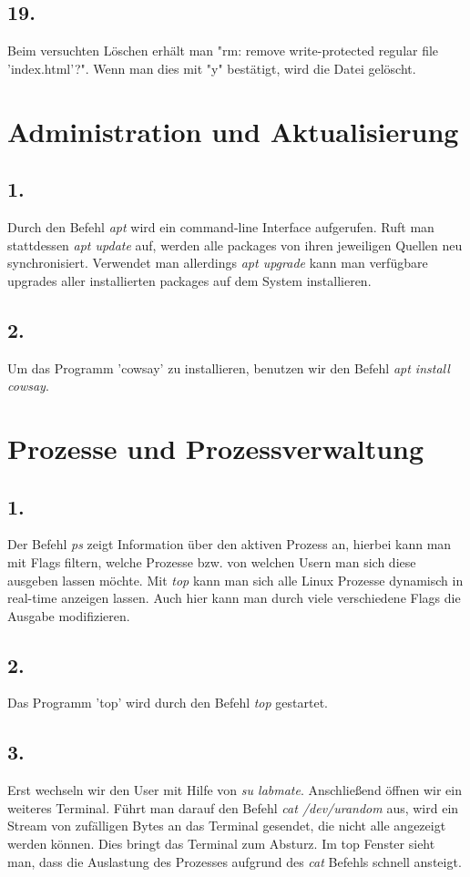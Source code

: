 \documentclass[
    fontsize=10pt,
    headings=medium,
    parskip=half,           %
    bibliography=totoc,
    numbers=noenddot,       %
    open=any,               %
    a4paper,
    ]{scrreprt}
\begin{document}
\subsection*{19.}
Beim versuchten Löschen erhält man "rm: remove write-protected regular file 'index.html'?". Wenn man dies mit "y" bestätigt, wird die Datei gelöscht.


\section{Administration und Aktualisierung}

\subsection*{1.}
Durch den Befehl \emph{apt} wird ein command-line Interface aufgerufen. Ruft man stattdessen \emph{apt update} auf, werden alle packages von ihren jeweiligen Quellen neu synchronisiert. Verwendet man allerdings \emph{apt upgrade} kann man verfügbare upgrades aller installierten packages auf dem System installieren. 

\subsection*{2.}
Um das Programm 'cowsay' zu installieren, benutzen wir den Befehl \emph{apt install cowsay}.

\section{Prozesse und Prozessverwaltung}

\subsection*{1.}
Der Befehl \emph{ps} zeigt Information über den aktiven Prozess an, hierbei kann man mit Flags filtern, welche Prozesse bzw. von welchen Usern man sich diese ausgeben lassen möchte. Mit \emph{top} kann man sich alle Linux Prozesse dynamisch in real-time anzeigen lassen. Auch hier kann man durch viele verschiedene Flags die Ausgabe modifizieren.

\subsection*{2.}
Das Programm 'top' wird durch den Befehl \emph{top} gestartet.

\subsection*{3.}
Erst wechseln wir den User mit Hilfe von \emph{su labmate}. Anschließend öffnen wir ein weiteres Terminal.
Führt man darauf den Befehl \emph{cat /dev/urandom} aus, wird ein Stream von zufälligen Bytes an das Terminal gesendet, die nicht alle angezeigt werden können. Dies bringt das Terminal zum Absturz. Im top Fenster sieht man, dass die Auslastung des Prozesses aufgrund des \emph{cat} Befehls schnell ansteigt.
\end{document}
